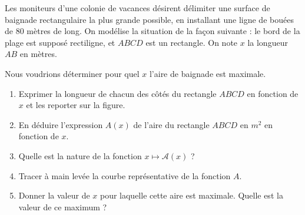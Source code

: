 
\begin{exercice}\label{exosmath-0087}

    \begin{multicols}{2}
Les moniteurs d'une colonie de vacances désirent délimiter une surface de baignade rectangulaire la plus grande possible, en installant une ligne de bouées de $80$ mètres de long. On modélise la situation de la façon suivante : le bord de la plage est supposé rectiligne, et $ABCD$ est un rectangle. On note $x$ la longueur $AB$ en mètres.

Nous voudrions déterminer pour quel \( x\) l'aire de baignade est maximale.

    \columnbreak



    \end{multicols}

\begin{enumerate}
\item Exprimer la longueur de chacun des côtés du rectangle $ABCD$ en
  fonction de $x$ et les reporter sur la figure.
\item En déduire l'expression $A(x)$ de l'aire du rectangle
  $ABCD$ en $m^2$ en fonction de $x$.
\item Quelle est la nature de la fonction $x\mapsto\mathscr{A}(x)$ ?
\item Tracer à main levée la courbe représentative de la fonction $A$.
\item Donner la valeur de $x$ pour laquelle cette aire est maximale. Quelle est la valeur de ce maximum ? 
\end{enumerate}

\end{exercice}
